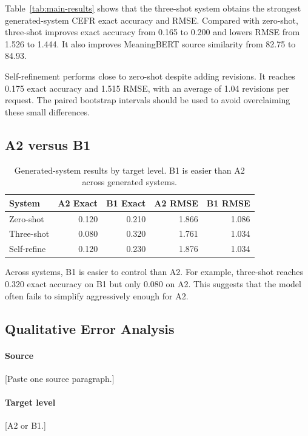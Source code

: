 \documentclass[11pt]{article}
\begin{document}
Table~\ref{tab:main-results} shows that the three-shot system obtains the strongest generated-system CEFR exact accuracy and RMSE. Compared with zero-shot, three-shot improves exact accuracy from 0.165 to 0.200 and lowers RMSE from 1.526 to 1.444. It also improves MeaningBERT source similarity from 82.75 to 84.93.

Self-refinement performs close to zero-shot despite adding revisions. It reaches 0.175 exact accuracy and 1.515 RMSE, with an average of 1.04 revisions per request. The paired bootstrap intervals should be used to avoid overclaiming these small differences.

\subsection{A2 versus B1}

\begin{table}[t]
\centering
\small
\begin{tabular}{lrrrr}
\toprule
System & A2 Exact & B1 Exact & A2 RMSE & B1 RMSE \\
\midrule
Zero-shot & 0.120 & 0.210 & 1.866 & 1.086 \\
Three-shot & 0.080 & 0.320 & 1.761 & 1.034 \\
Self-refine & 0.120 & 0.230 & 1.876 & 1.034 \\
\bottomrule
\end{tabular}
\caption{Generated-system results by target level. B1 is easier than A2 across generated systems.}
\label{tab:level-breakdown}
\end{table}

Across systems, B1 is easier to control than A2. For example, three-shot reaches 0.320 exact accuracy on B1 but only 0.080 on A2. This suggests that the model often fails to simplify aggressively enough for A2.

\subsection{Qualitative Error Analysis}

\paragraph{Source}
[Paste one source paragraph.]

\paragraph{Target level}
[A2 or B1.]
\end{document}
